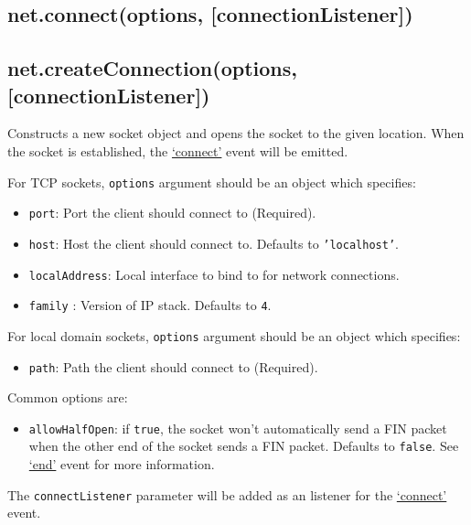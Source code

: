 \subsection{net.connect(options,
{[}connectionListener{]})}\label{net.connectoptions-connectionlistener}

\subsection{net.createConnection(options,
{[}connectionListener{]})}\label{net.createconnectionoptions-connectionlistener}

Constructs a new socket object and opens the socket to the given
location. When the socket is established, the
\hyperref[netux5feventux5fconnect]{`connect'} event will be emitted.

For TCP sockets, \texttt{options} argument should be an object which
specifies:

\begin{itemize}
\item
  \texttt{port}: Port the client should connect to (Required).
\item
  \texttt{host}: Host the client should connect to. Defaults to
  \texttt{'localhost'}.
\item
  \texttt{localAddress}: Local interface to bind to for network
  connections.
\item
  \texttt{family} : Version of IP stack. Defaults to \texttt{4}.
\end{itemize}

For local domain sockets, \texttt{options} argument should be an object
which specifies:

\begin{itemize}
\itemsep1pt\parskip0pt
\item
  \texttt{path}: Path the client should connect to (Required).
\end{itemize}

Common options are:

\begin{itemize}
\itemsep1pt\parskip0pt
\item
  \texttt{allowHalfOpen}: if \texttt{true}, the socket won't
  automatically send a FIN packet when the other end of the socket sends
  a FIN packet. Defaults to \texttt{false}. See
  \hyperref[netux5feventux5fend]{`end'} event for more information.
\end{itemize}

The \texttt{connectListener} parameter will be added as an listener for
the \hyperref[netux5feventux5fconnect]{`connect'} event.

